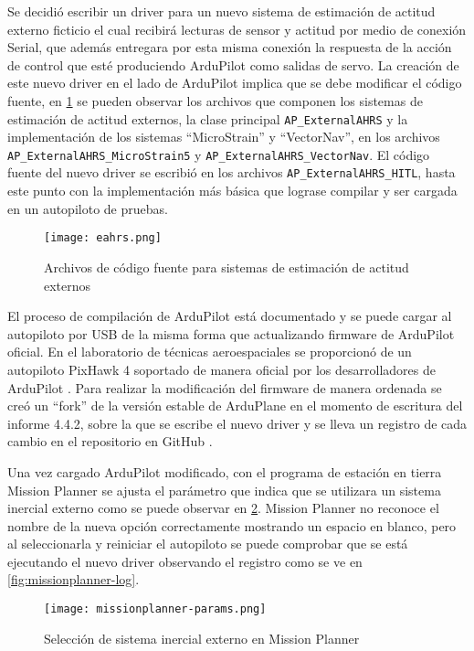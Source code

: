 Se decidió escribir un driver para un nuevo sistema de estimación de actitud externo ficticio el cual recibirá lecturas de sensor y actitud por medio de conexión Serial, que además entregara por esta misma conexión la respuesta de la acción de control que esté produciendo ArduPilot como salidas de servo. La creación de este nuevo driver en el lado de ArduPilot implica que se debe modificar el código fuente, en \cref{fig:eahrs} se pueden observar los archivos que componen los sistemas de estimación de actitud externos, la clase principal \texttt{AP\_ExternalAHRS} y la implementación de los sistemas ``MicroStrain'' y ``VectorNav'', en los archivos \texttt{AP\_ExternalAHRS\_MicroStrain5} y \texttt{AP\_ExternalAHRS\_VectorNav}. El código fuente del nuevo driver se escribió en los archivos \texttt{AP\_ExternalAHRS\_HITL}, hasta este punto con la implementación más básica que lograse compilar y ser cargada en un autopiloto de pruebas.

\begin{figure}[h]
    \centering
    \texttt{[image: eahrs.png]}
    \caption{Archivos de código fuente para sistemas de estimación de actitud externos}
    \label{fig:eahrs}
\end{figure}

El proceso de compilación de ArduPilot está documentado \cite{ap-build} y se puede cargar al autopiloto por USB de la misma forma que actualizando firmware de ArduPilot oficial. En el laboratorio de técnicas aeroespaciales se proporcionó de un autopiloto PixHawk 4 soportado de manera oficial por los desarrolladores de ArduPilot \cite{pixhawk4}. Para realizar la modificación del firmware de manera ordenada se creó un ``fork'' de la versión estable de ArduPlane en el momento de escritura del informe 4.4.2, sobre la que se escribe el nuevo driver y se lleva un registro de cada cambio en el repositorio en GitHub \cite{ap-hitl-fork}.

Una vez cargado ArduPilot modificado, con el programa de estación en tierra Mission Planner se ajusta el parámetro que indica que se utilizara un sistema inercial externo como se puede observar en \cref{fig:missionplanner-params}. Mission Planner no reconoce el nombre de la nueva opción correctamente mostrando un espacio en blanco, pero al seleccionarla y reiniciar el autopiloto se puede comprobar que se está ejecutando el nuevo driver observando el registro como se ve en \cref{fig:missionplanner-log}.

\begin{figure}[h]
    \centering
    \texttt{[image: missionplanner-params.png]}
    \caption{Selección de sistema inercial externo en Mission Planner}
    \label{fig:missionplanner-params}
\end{figure}

